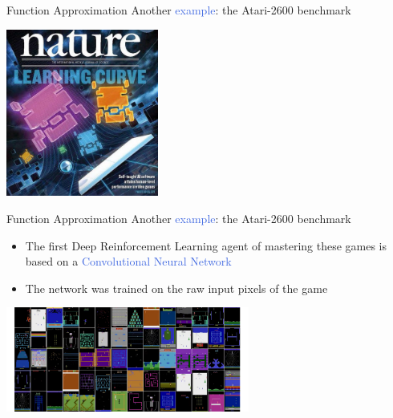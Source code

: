 \documentclass{beamer}
\begin{document}
\begin{frame}{Function Approximation}
	Another \textcolor{RoyalBlue}{example}: the Atari-2600 benchmark
	\bigskip

	\begin{center}
		\includegraphics[width=5cm]{./Images/nature}
	\end{center}

\end{frame}

\begin{frame}{Function Approximation}
	Another \textcolor{RoyalBlue}{example}: the Atari-2600 benchmark

	\begin{itemize}
		\item The first Deep Reinforcement Learning agent of mastering these games is based on a \textcolor{RoyalBlue}{Convolutional Neural Network}
		\item The network was trained on the raw input pixels of the game
	\end{itemize}
	
	\begin{center}
		\includegraphics[width=8cm]{./Images/games}
	\end{center}
\end{frame}
\end{document}
